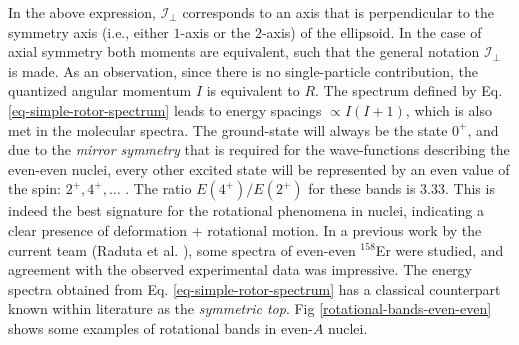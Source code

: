 In the above expression, $\mathcal{I}_\perp$ corresponds to an axis that is perpendicular to the symmetry axis (i.e., either $1$-axis or the $2$-axis) of the ellipsoid. In the case of axial symmetry both moments are equivalent, such that the general notation $\mathcal{I}_\perp$ is made. As an observation, since there is no single-particle contribution, the quantized angular momentum $I$ is equivalent to $R$. The spectrum defined by Eq. \ref{eq-simple-rotor-spectrum} leads to energy spacings $\propto I(I+1)$, which is also met in the molecular spectra. The ground-state will always be the state $0^+$, and due to the \emph{mirror symmetry} that is required for the wave-functions describing the even-even nuclei, every other excited state will be represented by an even value of the spin: $2^+,4^+,\dots$ \cite{ring2004nuclear}. The ratio $E(4^+)/E(2^+)$ for these bands is $3.33$. This is indeed the best signature for the rotational phenomena in nuclei, indicating a clear presence of deformation + rotational motion. In a previous work by the current team (Raduta et al. \cite{raduta2017semiclassical}), some spectra of even-even $^{158}$Er were studied, and agreement with the observed experimental data was impressive. The energy spectra obtained from Eq. \ref{eq-simple-rotor-spectrum} has a classical counterpart known within literature as the \emph{symmetric top}. Fig \ref{rotational-bands-even-even} shows some examples of rotational bands in even-$A$ nuclei.
